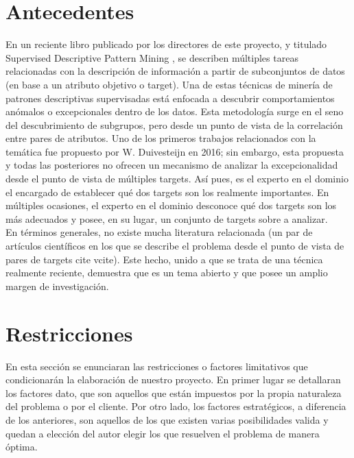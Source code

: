 \documentclass[a4paper,12pt,twoside,final]{book}
\begin{document}
\section{Antecedentes}
En un reciente libro publicado por los directores de este proyecto, y titulado Supervised Descriptive Pattern Mining \cite{}, se describen múltiples tareas relacionadas con la descripción de información a partir de subconjuntos de datos (en base a un atributo objetivo o target). Una de estas técnicas de minería de patrones descriptivas supervisadas está enfocada a descubrir comportamientos anómalos o excepcionales dentro de los datos. Esta metodología surge en el seno del descubrimiento de subgrupos, pero desde un punto de vista de la correlación entre pares de atributos. Uno de los primeros trabajos relacionados con la temática fue propuesto por W. Duivesteijn \cite{} en 2016; sin embargo, esta propuesta y todas las posteriores no ofrecen un mecanismo de analizar la excepcionalidad desde el punto de vista de múltiples targets. Así pues, es el experto en el dominio el encargado de establecer qué dos targets son los realmente importantes. En múltiples ocasiones, el experto en el dominio desconoce qué dos targets son los más adecuados y posee, en su lugar, un conjunto de targets sobre a analizar.\\

En términos generales, no existe mucha literatura relacionada (un par de artículos científicos en los que se describe el problema desde el punto de vista de pares de targets cite{} vcite{}). Este hecho, unido a que se trata de una técnica realmente reciente, demuestra que es un tema abierto y que posee un amplio margen de investigación.

\newpage
\section{Restricciones}
En esta sección se enunciaran las restricciones o factores limitativos que condicionarán la elaboración de nuestro proyecto. En primer lugar se detallaran los factores dato, que son aquellos que están impuestos por la propia naturaleza del problema o por el cliente. Por otro lado, los factores estratégicos, a diferencia de los anteriores, son aquellos de los que existen varias posibilidades valida y quedan a elección del autor elegir los que resuelven el problema de manera óptima.\\
\end{document}
